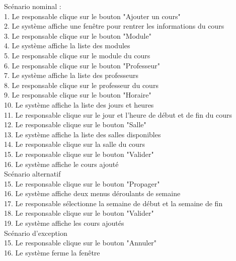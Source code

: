 \documentclass[12pt,a4paper]{article}
\begin{document}
Scénario nominal : \\
1. Le responsable clique sur le bouton "Ajouter un cours"\\
2. Le système affiche une fenêtre pour rentrer les informations du cours\\
3. Le responsable clique sur le bouton "Module"\\
4. Le système affiche la liste des modules\\
5. Le responsable clique sur le module du cours\\
6. Le responsable clique sur le bouton "Professeur"\\
7. Le système affiche la liste des professeurs\\
8. Le responsable clique sur le professeur du cours\\
9. Le responsable clique sur le bouton "Horaire"\\
10. Le système affiche la liste des jours et heures\\
11. Le responsable clique sur le jour et l'heure de début et de fin du cours\\
12. Le responsable clique sur le bouton "Salle"\\
13. Le système affiche la liste des salles disponibles\\
14. Le responsable clique sur la salle du cours\\
15. Le responsable clique sur le bouton "Valider"\\
16. Le système affiche le cours ajouté\\

Scénario alternatif\\
15. Le responsable clique sur le bouton "Propager"\\
16. Le système affiche deux menus déroulants de semaine\\
17. Le responsable sélectionne la semaine de début et la semaine de fin\\
18. Le responsable clique sur le bouton "Valider"\\
19. Le système affiche les cours ajoutés\\

Scénario d'exception\\
15. Le responsable clique sur le bouton "Annuler"\\
16. Le système ferme la fenêtre\\
\end{document}
